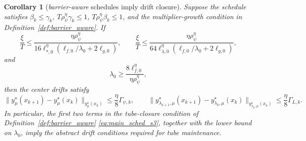 \documentclass{article}
\newtheorem{corollary}{Corollary}
\begin{document}
\begin{corollary}[\textit{barrier-aware} schedules imply drift closure]
\label{cor:tube_drift_closure}
Suppose the schedule satisfies \(\beta_k\le\gamma_k\),
\(T\rho_\psi^\eta\gamma_k\le1\), \(T\rho_\psi^\eta\beta_k\le1\), and the multiplier-growth
condition in Definition~\ref{def:barrier_aware}. If
\begin{equation}
\label{eq:tube_closure_xi_conditions}
\frac{\xi}{T}
\le
\frac{\eta\rho_\psi^\eta}
{16\ell_{*,0}^{\eta}
\left(\ell_{f,0}/\lambda_0+2\ell_{g,0}\right)},
\qquad
\frac{\xi}{T}
\le
\frac{\eta\rho_\psi^\eta}
{64\ell_{\lambda,0}^{\eta}
\left(\ell_{f,0}/\lambda_0+2\ell_{g,0}\right)},
\end{equation}
and
\begin{equation}
\label{eq:tube_closure_lambda0_condition}
\lambda_0
\ge
\frac{8\ell_{f,0}^{\eta}}{\eta\rho_\psi^\eta},
\end{equation}
then the center drifts satisfy
\begin{equation}
\label{eq:tube_drift_dominance}
\|y_\mu^\star(x_{k+1})-y_\mu^\star(x_k)\|_{y_\mu^\star(x_k)}
\le
\frac{\eta}{8}\Gamma_{\psi,k},
\qquad
\|y_{\lambda_{k+1},\mu}^\star(x_{k+1})
-y_{\lambda_k,\mu}^\star(x_k)\|_{y_{\lambda_k,\mu}^\star(x_k)}
\le
\frac{\eta}{8}\Gamma_{L,k}.
\end{equation}
In particular, the first two terms in the tube-closure condition of
Definition~\ref{def:barrier_aware} \eqref{eq:main_sched_s3}, together with the lower bound on \(\lambda_0\), imply the
abstract drift conditions required for tube maintenance.
\end{corollary}
\end{document}
